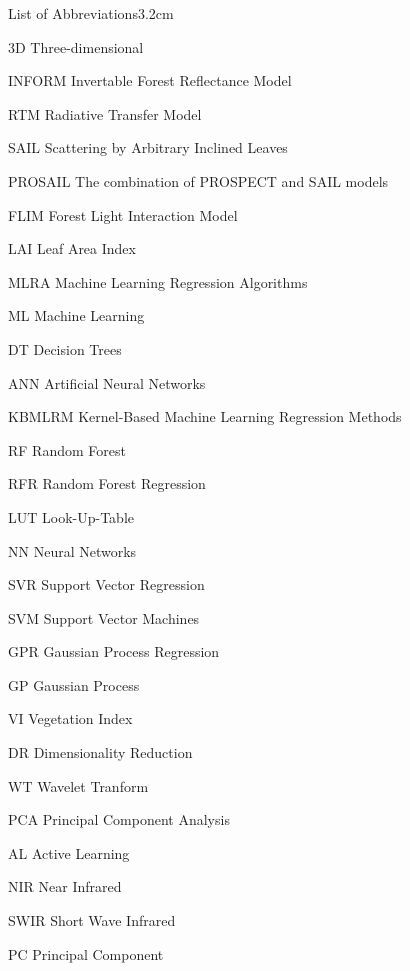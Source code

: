 \begin{mclistof}{List of Abbreviations}{3.2cm}

\item[3D] Three-dimensional
\item[INFORM] Invertable Forest Reflectance Model
\item[RTM] Radiative Transfer Model
\item[SAIL] Scattering by Arbitrary Inclined Leaves
\item[PROSAIL] The combination of PROSPECT and SAIL models
\item[FLIM] Forest Light Interaction Model
\item[LAI] Leaf Area Index
\item[MLRA] Machine Learning Regression Algorithms
\item[ML] Machine Learning
\item[DT] Decision Trees
\item[ANN] Artificial Neural Networks
\item[KBMLRM] Kernel-Based Machine Learning Regression Methods
\item[RF] Random Forest
\item[RFR] Random Forest Regression
\item[LUT] Look-Up-Table
\item[NN] Neural Networks
\item[SVR] Support Vector Regression
\item[SVM] Support Vector Machines
\item[GPR] Gaussian Process Regression
\item[GP] Gaussian Process
\item[VI] Vegetation Index
\item[DR] Dimensionality Reduction
\item[WT] Wavelet Tranform
\item[PCA] Principal Component Analysis
\item[AL] Active Learning
\item[NIR] Near Infrared
\item[SWIR] Short Wave Infrared
\item[PC] Principal Component

\end{mclistof} 
